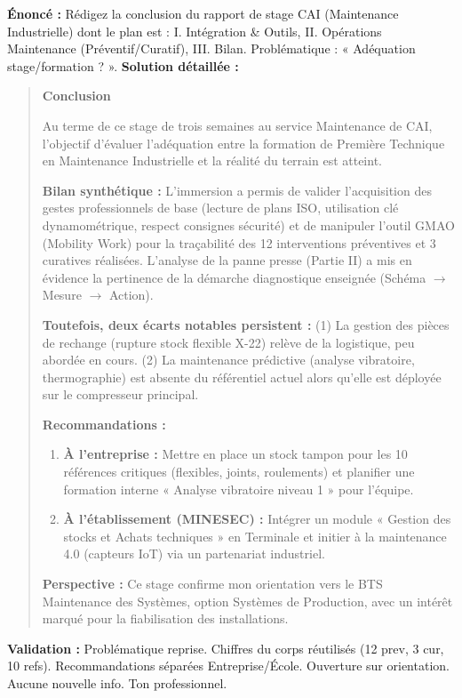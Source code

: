 \documentclass[11pt]{article}
\begin{document}
\begin{exoresolu}
    \textbf{Énoncé :} Rédigez la conclusion du rapport de stage CAI (Maintenance Industrielle) dont le plan est : I. Intégration \& Outils, II. Opérations Maintenance (Préventif/Curatif), III. Bilan. Problématique : « Adéquation stage/formation ? ».
    \tcblower
    \textbf{Solution détaillée :}
    \begin{quote}
        \textbf{Conclusion}
        
        Au terme de ce stage de trois semaines au service Maintenance de CAI, l'objectif d'évaluer l'adéquation entre la formation de Première Technique en Maintenance Industrielle et la réalité du terrain est atteint.
        
        \textbf{Bilan synthétique :} L'immersion a permis de valider l'acquisition des gestes professionnels de base (lecture de plans ISO, utilisation clé dynamométrique, respect consignes sécurité) et de manipuler l'outil GMAO (Mobility Work) pour la traçabilité des 12 interventions préventives et 3 curatives réalisées. L'analyse de la panne presse (Partie II) a mis en évidence la pertinence de la démarche diagnostique enseignée (Schéma $\rightarrow$ Mesure $\rightarrow$ Action).
        
        \textbf{Toutefois, deux écarts notables persistent :} (1) La gestion des pièces de rechange (rupture stock flexible X-22) relève de la logistique, peu abordée en cours. (2) La maintenance prédictive (analyse vibratoire, thermographie) est absente du référentiel actuel alors qu'elle est déployée sur le compresseur principal.
        
        \textbf{Recommandations :}
        \begin{enumerate}
            \item \textbf{À l'entreprise :} Mettre en place un stock tampon pour les 10 références critiques (flexibles, joints, roulements) et planifier une formation interne « Analyse vibratoire niveau 1 » pour l'équipe.
            \item \textbf{À l'établissement (MINESEC) :} Intégrer un module « Gestion des stocks et Achats techniques » en Terminale et initier à la maintenance 4.0 (capteurs IoT) via un partenariat industriel.
        \end{enumerate}
        
        \textbf{Perspective :} Ce stage confirme mon orientation vers le BTS Maintenance des Systèmes, option Systèmes de Production, avec un intérêt marqué pour la fiabilisation des installations.
    \end{quote}
    \textbf{Validation :} Problématique reprise. Chiffres du corps réutilisés (12 prev, 3 cur, 10 refs). Recommandations séparées Entreprise/École. Ouverture sur orientation. Aucune nouvelle info. Ton professionnel.
\end{exoresolu}
\end{document}
